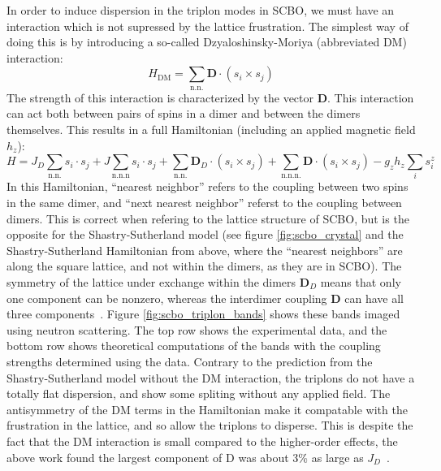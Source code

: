 \documentclass{thesis-umich}
\begin{document}
In order to induce dispersion in the triplon modes in SCBO, we must have an interaction which is not supressed by the lattice frustration. The simplest way of doing this is by introducing a so-called Dzyaloshinsky-Moriya (abbreviated DM) interaction:
\[ H_{\mathrm{DM}} = \sum_{\mathrm{n.n.}} \mathbf{D} \cdot (s_i \times s_j) \]
The strength of this interaction is characterized by the vector $\mathbf{D}$. This interaction can act both between pairs of spins in a dimer and between the dimers themselves. This results in a full Hamiltonian (including an applied magnetic field $h_z$):
\[ H = J_D \sum_{\mathrm{n.n.}} s_i \cdot s_j + J \sum_{\mathrm{n.n.n}} s_i \cdot s_j + \sum_{\mathrm{n.n.}} \mathbf{D}_D \cdot (s_i \times s_j) + \sum_{\mathrm{n.n.n.}} \mathbf{D} \cdot (s_i \times s_j) - g_z h_z \sum_i s_i^z\]
In this Hamiltonian, ``nearest neighbor'' refers to the coupling between two spins in the same dimer, and ``next nearest neighbor'' referst to the coupling between dimers. This is correct when refering to the lattice structure of SCBO, but is the opposite for the Shastry-Sutherland model (see figure \ref{fig:scbo_crystal} and the Shastry-Sutherland Hamiltonian from above, where the ``nearest neighbors'' are along the square lattice, and not within the dimers, as they are in SCBO). The symmetry of the lattice under exchange within the dimers $\mathbf{D}_D$ means that only one component can be nonzero, whereas the interdimer coupling $\mathbf{D}$ can have all three components~\cite{McClarty2017}. Figure \ref{fig:scbo_triplon_bands} shows these bands imaged using neutron scattering. The top row shows the experimental data, and the bottom row shows theoretical computations of the bands with the coupling strengths determined using the data. Contrary to the prediction from the Shastry-Sutherland model without the DM interaction, the triplons do not have a totally flat dispersion, and show some spliting without any applied field. The antisymmetry of the DM terms in the Hamiltonian make it compatable with the frustration in the lattice, and so allow the triplons to disperse. This is despite the fact that the DM interaction is small compared to the higher-order effects, the above work found the largest component of $\mathrm{D}$ was about 3\% as large as $J_D$~\cite{McClarty2017}.
\end{document}
